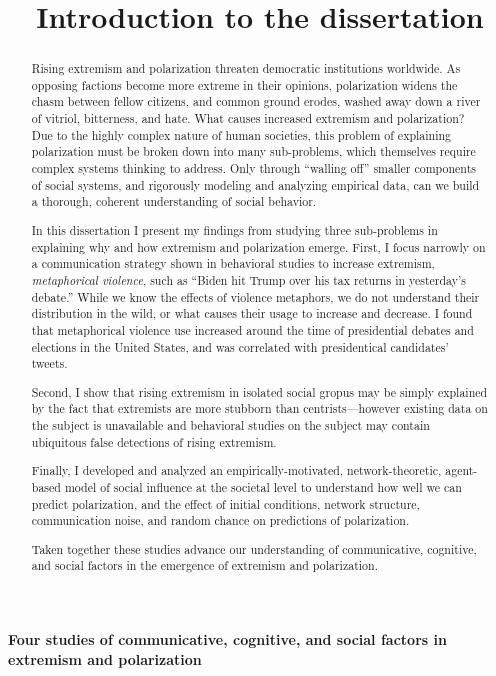 \documentclass[12pt,letterpaper]{article}
\title{Introduction to the dissertation}
\date{}
\begin{document}

\vspace{-2.5in}
\textbf{Four studies of communicative, cognitive, and social factors in
extremism and polarization} 
\begin{abstract}
  Rising extremism and polarization threaten democratic institutions worldwide.
  As opposing factions become more extreme in their opinions, polarization
  widens the chasm between fellow citizens, and common ground erodes, washed
  away down a river of vitriol, bitterness, and hate. What causes increased
  extremism and polarization? Due to the highly complex nature of human
  societies, this problem of explaining polarization must be broken down into
  many sub-problems, which themselves require complex systems thinking to
  address. Only through ``walling off'' smaller components of social systems,
  and rigorously modeling and analyzing empirical data,
  can we build a thorough, coherent understanding of social behavior.

  In this dissertation I present my findings from studying three
  sub-problems in explaining why and how extremism and polarization emerge.
  First, I focus narrowly on a communication strategy shown in behavioral
  studies to increase extremism, \emph{metaphorical violence}, such as 
  ``Biden hit Trump over his tax returns in yesterday's debate.'' While we know
  the effects of violence metaphors, we do not understand their distribution
  in the wild, or what causes their usage to increase and decrease. I found
  that metaphorical violence use increased around the time of presidential
  debates and elections in the United States, and was correlated with 
  presidentical candidates' tweets. 

  Second, I show that rising extremism
  in isolated social gropus may be simply explained by the fact that
  extremists are more stubborn than centrists---however existing data on the
  subject is unavailable and behavioral studies on the subject may
  contain ubiquitous false detections of rising extremism. 

  Finally, I developed
  and analyzed an empirically-motivated, network-theoretic, agent-based model of 
  social influence at the societal level to understand how well we can 
  predict polarization, and the effect of initial conditions, network structure,
  communication noise, and random chance on predictions of polarization.

  Taken together these studies advance our understanding of communicative,
  cognitive, and social factors in the emergence of extremism and polarization.
\end{abstract}
\end{document}
